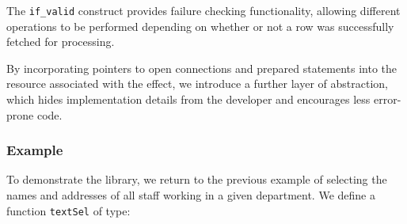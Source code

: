\noindent
The \texttt{if\_valid} construct provides failure checking functionality, allowing different operations to be performed depending on whether or not a row was successfully fetched for processing.





By incorporating pointers to open connections and prepared statements into the
resource associated with the effect, we introduce a further layer of
abstraction, which hides implementation details from the developer and
encourages less error-prone code. 

\subsubsection{Example}

To demonstrate the 
library, we return to the previous example of selecting the names and addresses
of all staff working in a given department. 
We define a function \texttt{textSel} of type:

